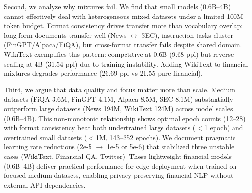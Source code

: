Second, we analyze why mixtures fail. We find that small models (0.6B–4B) cannot effectively deal with heterogeneous mixed datasets under a limited 100M token budget. Format consistency drives transfer more than vocabulary overlap: long-form documents transfer well (News $\leftrightarrow$ SEC), instruction tasks cluster (FinGPT/Alpaca/FiQA), but cross-format transfer fails despite shared domain. WikiText exemplifies this pattern: competitive at 0.6B (9.68 ppl) but reverse scaling at 4B (31.54 ppl) due to training instability. Adding WikiText to financial mixtures degrades performance (26.69 ppl vs 21.55 pure financial).

Third, we argue that data quality and focus matter more than scale. Medium datasets (FiQA 3.6M, FinGPT 4.1M, Alpaca 8.5M, SEC 8.1M) substantially outperform large datasets (News 194M, WikiText 124M) across model scales (0.6B–4B). This non-monotonic relationship shows optimal epoch counts (12–28) with format consistency beat both undertrained large datasets ($<$1 epoch) and overtrained small datasets ($<$1M, 143–352 epochs). We document pragmatic learning rate reductions (2e-5 $\to$ 1e-5 or 5e-6) that stabilized three unstable cases (WikiText, Financial QA, Twitter). These lightweight financial models (0.6B–4B) deliver practical performance for edge deployment when trained on focused medium datasets, enabling privacy-preserving financial NLP without external API dependencies.

